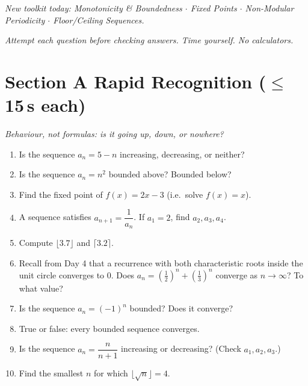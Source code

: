\documentclass[11pt,a4paper]{article}
\begin{document}
\noindent\textit{New toolkit today: Monotonicity \& Boundedness $\cdot$ Fixed Points $\cdot$ Non-Modular Periodicity $\cdot$ Floor/Ceiling Sequences.}

\vspace{2pt}
\noindent\textit{Attempt each question before checking answers. Time yourself. No calculators.}

\section*{Section A \quad Rapid Recognition \hfill{\normalfont\small($\leq$15\,s each)}}

\noindent\textit{Behaviour, not formulas: is it going up, down, or nowhere?}

\begin{enumerate}

\item Is the sequence $a_n=5-n$ increasing, decreasing, or neither?

\item Is the sequence $a_n=n^2$ bounded above? Bounded below?

\item Find the fixed point of $f(x)=2x-3$ (i.e.\ solve $f(x)=x$).

\item A sequence satisfies $a_{n+1}=\dfrac1{a_n}$. If $a_1=2$, find $a_2,a_3,a_4$.

\item Compute $\lfloor3.7\rfloor$ and $\lceil3.2\rceil$.

\item Recall from Day 4 that a recurrence with both characteristic roots inside the unit circle converges to $0$. Does $a_n=\left(\tfrac12\right)^n+\left(\tfrac13\right)^n$ converge as $n\to\infty$? To what value?

\item Is the sequence $a_n=(-1)^n$ bounded? Does it converge?

\item True or false: every bounded sequence converges.

\item Is the sequence $a_n=\dfrac n{n+1}$ increasing or decreasing? (Check $a_1,a_2,a_3$.)

\item Find the smallest $n$ for which $\lfloor\sqrt n\rfloor=4$.

\end{enumerate}
\end{document}
